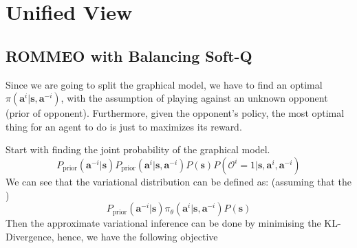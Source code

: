 \section{Unified View}
\subsection{ROMMEO with Balancing Soft-Q}
Since we are going to split the graphical model, we have to find an optimal $\pi(\boldsymbol{a}^i | \boldsymbol{s}, \boldsymbol{a}^{-i})$, with the assumption of playing against an unknown opponent (prior of opponent). Furthermore, given the opponent's policy, the most optimal thing for an agent to do is just to maximizes its reward.

\begin{figure}[ht]
    \begin{minipage}[t]{0.5\linewidth}
    \centering
    \end{minipage}%
    \begin{minipage}[t]{0.5\linewidth}
    \end{minipage}
\end{figure}
Start with finding the joint probability of the graphical model.
\begin{equation}
    P_{\text{prior}}(\boldsymbol{a}^{-i} | \boldsymbol{s}) P_{\text{prior}}(\boldsymbol{a}^i | \boldsymbol{s}, \boldsymbol{a}^{-i}) P(\boldsymbol{s}) P(\mathcal{O}^i = 1 | \boldsymbol{s}, \boldsymbol{a}^i, \boldsymbol{a}^{-i})
\end{equation}
We can see that the variational distribution can be defined as: (assuming that the )
\begin{equation}
    P_{\text{prior}}(\boldsymbol{a}^{-i} | \boldsymbol{s}) \pi_{\theta}(\boldsymbol{a}^{i} | \boldsymbol{s}, \boldsymbol{a}^{-i}) P(\boldsymbol{s})
\end{equation}
Then the approximate variational inference can be done by minimising the KL-Divergence, hence, we have the following objective 

